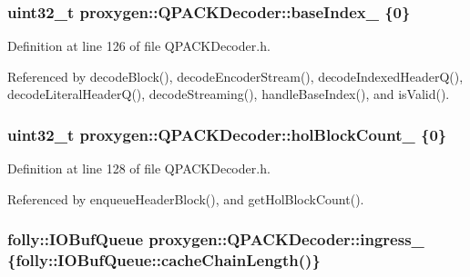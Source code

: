 \subsubsection[{base\+Index\+\_\+}]{\setlength{\rightskip}{0pt plus 5cm}uint32\+\_\+t proxygen\+::\+Q\+P\+A\+C\+K\+Decoder\+::base\+Index\+\_\+ \{0\}\hspace{0.3cm}{\ttfamily [private]}}\label{classproxygen_1_1QPACKDecoder_a2dd920b6ef71a75e648d7f52b781ba9e}


Definition at line 126 of file Q\+P\+A\+C\+K\+Decoder.\+h.



Referenced by decode\+Block(), decode\+Encoder\+Stream(), decode\+Indexed\+Header\+Q(), decode\+Literal\+Header\+Q(), decode\+Streaming(), handle\+Base\+Index(), and is\+Valid().

\subsubsection[{hol\+Block\+Count\+\_\+}]{\setlength{\rightskip}{0pt plus 5cm}uint32\+\_\+t proxygen\+::\+Q\+P\+A\+C\+K\+Decoder\+::hol\+Block\+Count\+\_\+ \{0\}\hspace{0.3cm}{\ttfamily [private]}}\label{classproxygen_1_1QPACKDecoder_a8bbd8390203a36dfc9d1ed344b9bfede}


Definition at line 128 of file Q\+P\+A\+C\+K\+Decoder.\+h.



Referenced by enqueue\+Header\+Block(), and get\+Hol\+Block\+Count().

\subsubsection[{ingress\+\_\+}]{\setlength{\rightskip}{0pt plus 5cm}folly\+::\+I\+O\+Buf\+Queue proxygen\+::\+Q\+P\+A\+C\+K\+Decoder\+::ingress\+\_\+ \{folly\+::\+I\+O\+Buf\+Queue\+::cache\+Chain\+Length()\}\hspace{0.3cm}{\ttfamily [private]}}\label{classproxygen_1_1QPACKDecoder_a1ffd15ada78d450a7943d34fe947d465}


